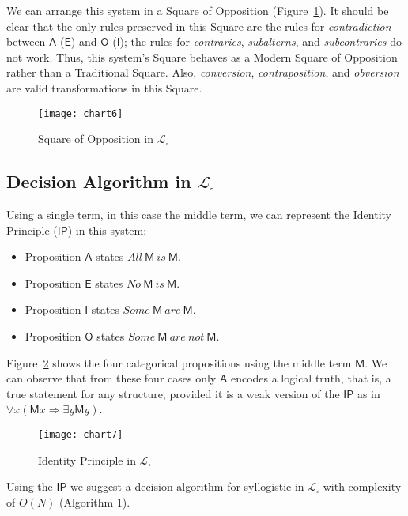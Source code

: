 \documentclass[a4paper,UKenglish]{lipics}
\begin{document}
We can arrange this system in a Square of Opposition (Figure~\ref{fig:5}). It should be clear that the only rules preserved in this Square are the rules for \textit{contradiction} between $\mathsf{A}$ ($\mathsf{E}$) and $\mathsf{O}$ ($\mathsf{I}$); the rules for \textit{contraries}, \textit{subalterns}, and \textit{subcontraries} do not work. Thus, this system's Square behaves as a Modern Square of Opposition rather than a Traditional Square. Also, \textit{conversion}, \textit{contraposition}, and \textit{obversion} are valid transformations in this Square.  

\begin{figure}[h]
  \texttt{[image: chart6]}
  \caption{Square of Opposition in $\mathcal{L}_{\square}$}
  \label{fig:5}
\end{figure}

\subsection{Decision Algorithm in $\mathcal{L}_{\square}$}
Using a single term, in this case the middle term, we can represent the Identity Principle ($\mathsf{IP}$) in this system: 

\begin{itemize}
\item Proposition $\mathsf{A}$ states $All\ \mathsf{M}\  is\ \mathsf{M}$.
\item Proposition $\mathsf{E}$ states $No\ \mathsf{M}\  is\ \mathsf{M}$.
\item Proposition $\mathsf{I}$ states $Some\ \mathsf{M}\  are\ \mathsf{M}$.
\item Proposition $\mathsf{O}$ states $Some\ \mathsf{M}\  are\ not\ \mathsf{M}$.
\end{itemize}

Figure~\ref{fig:9} shows the four categorical propositions using the middle term $\mathsf{M}$. We can observe that from these four cases only $\mathsf{A}$ encodes a logical truth, that is, a true statement for any structure, provided it is a weak version of the $\mathsf{IP}$ as in $\forall x(\mathsf{M}x \Rightarrow \exists y\mathsf{M}y)$. 

\pagebreak

\begin{figure}[h]
  \texttt{[image: chart7]}
  \caption{Identity Principle in $\mathcal{L}_{\square}$}
  \label{fig:9}
\end{figure}

Using the $\mathsf{IP}$ we suggest a decision algorithm for syllogistic in $\mathcal{L}_{\square}$ with complexity of $O(N)$ (Algorithm 1).
\end{document}
